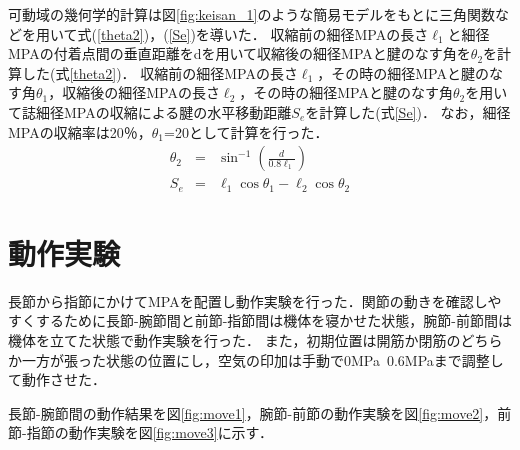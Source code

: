 \documentclass{jarticle}
\begin{document}
可動域の幾何学的計算は図\ref{fig:keisan_1}のような簡易モデルをもとに三角関数などを用いて式(\ref{theta2})，(\ref{Se})を導いた．
収縮前の細径MPAの長さ$\ell_1$と細径MPAの付着点間の垂直距離をdを用いて収縮後の細径MPAと腱のなす角を$\theta_{2}$を計算した(式\ref{theta2})．
収縮前の細径MPAの長さ$\ell_1$，その時の細径MPAと腱のなす角$\theta_{1}$，収縮後の細径MPAの長さ$\ell_2$，その時の細径MPAと腱のなす角$\theta_{2}$を用いて誌細径MPAの収縮による腱の水平移動距離$S_e$を計算した(式\ref{Se})．
なお，細径MPAの収縮率は20％，$\theta_{1}$=20として計算を行った．
\begin{eqnarray}
	\label{theta2} \theta_2 &=& \sin^{-1}\left(\frac{d}{0.8 \ell_1}\right)\\
  \label{Se} S_e &=& \ell_1 \cos\theta_1 - \ell_2 \cos\theta_2
\end{eqnarray}
\vspace*{-2mm}
\section{動作実験}
長節から指節にかけてMPAを配置し動作実験を行った．関節の動きを確認しやすくするために長節-腕節間と前節-指節間は機体を寝かせた状態，腕節-前節間は機体を立てた状態で動作実験を行った．
また，初期位置は開筋か閉筋のどちらか一方が張った状態の位置にし，空気の印加は手動で0MPa~0.6MPaまで調整して動作させた．

長節-腕節間の動作結果を図\ref{fig:move1}，腕節-前節の動作実験を図\ref{fig:move2}，前節-指節の動作実験を図\ref{fig:move3}に示す．
\end{document}
